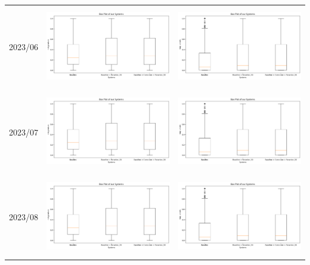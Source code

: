 \begin{tabular}{|c|c|c|}
2023/06 & \includegraphics[height=3.5cm]{figure/box_ndcg_3.png} & \includegraphics[height=3.5cm]{figure/box_ap_3.png} \\
2023/07 & \includegraphics[height=3.5cm]{figure/box_ndcg_3.png} & \includegraphics[height=3.5cm]{figure/box_ap_3.png} \\
2023/08 & \includegraphics[height=3.5cm]{figure/box_ndcg_3.png} & \includegraphics[height=3.5cm]{figure/box_ap_3.png} \\
\hline
\end{tabular}




